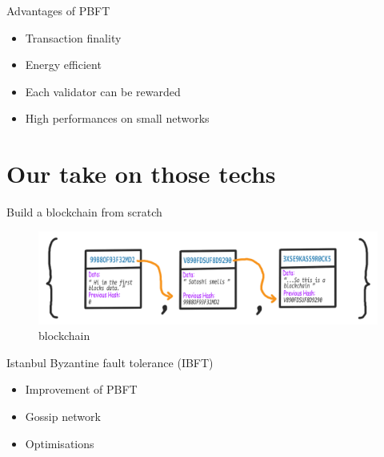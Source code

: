 \documentclass[12pt]{beamer}
\begin{document}
  \begin{frame}{Advantages of PBFT}
    \begin{itemize}
      \item Transaction finality
      \item Energy efficient
      \item Each validator can be rewarded
      \item High performances on small networks
    \end{itemize}
  \end{frame}

  \section{Our take on those techs}

  \begin{frame}{Build a blockchain from scratch}
    \begin{figure}
      \includegraphics[height=.35\textheight]{images/scratch}
      \caption{blockchain}
    \end{figure}
  \end{frame}

  \begin{frame}{Istanbul Byzantine fault tolerance (IBFT)}
    \begin{itemize}
      \item Improvement of PBFT
      \item Gossip network
      \item Optimisations
    \end{itemize}
  \end{frame}
\end{document}
